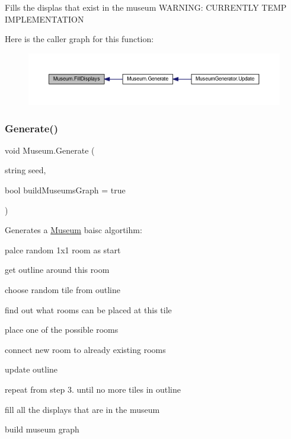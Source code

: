 Fills the displas that exist in the museum W\+A\+R\+N\+I\+NG\+: C\+U\+R\+R\+E\+N\+T\+LY T\+E\+MP I\+M\+P\+L\+E\+M\+E\+N\+T\+A\+T\+I\+ON 

Here is the caller graph for this function\+:
\nopagebreak
\begin{figure}[H]
\begin{center}
\leavevmode
\includegraphics[width=350pt]{class_museum_ae07741bc8fd7f97c84fed0050e18c3c4_icgraph}
\end{center}
\end{figure}
\mbox{\label{class_museum_a2a301b4e27f35da164ffa03b3d3d7e81}} 
\subsubsection{\texorpdfstring{Generate()}{Generate()}}
{\footnotesize\ttfamily void Museum.\+Generate (\begin{DoxyParamCaption}\item[{string}]{seed,  }\item[{bool}]{build\+Museums\+Graph = {\ttfamily true} }\end{DoxyParamCaption})}



Generates a \mbox{\hyperlink{class_museum}{Museum}} baisc algortihm\+: 


\begin{DoxyEnumerate}
\item palce random 1x1 room as start
\item get outline around this room
\item choose random tile from outline
\item find out what rooms can be placed at this tile
\item place one of the possible rooms
\item connect new room to already existing rooms
\item update outline
\item repeat from step 3. until no more tiles in outline
\item fill all the displays that are in the museum
\item build museum graph 
\end{DoxyEnumerate}


